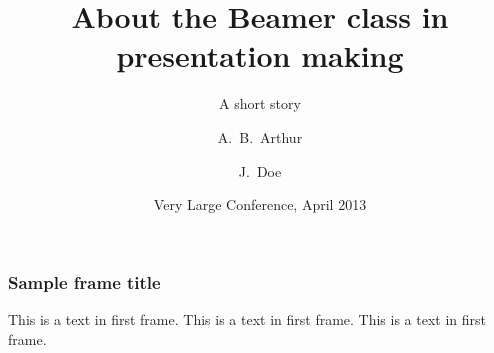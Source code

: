 \documentclass{beamer}
\title[About Beamer] %
{About the Beamer class in presentation making}
\subtitle{A short story}
\author[Arthur, Doe] %
{A.~B.~Arthur\inst{1} \and J.~Doe\inst{2}}
\institute[VFU] %
{
\inst{1}%
Faculty of Physics\\
Very Famous University
\and
\inst{2}%
Faculty of Chemistry\\
Very Famous University
}
\date[VLC 2013] %
{Very Large Conference, April 2013}
\begin{document}
 
\frame{\titlepage}
 
\begin{frame}
\frametitle{Sample frame title}
This is a text in first frame. This is a text in first frame. This is a text in first frame.
\end{frame}
 
\end{document}
